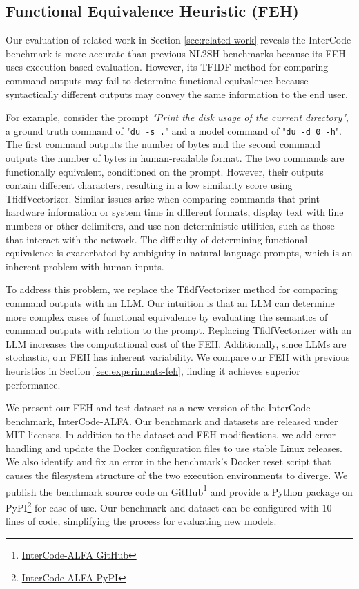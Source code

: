 \documentclass[11pt]{article}
\begin{document}
\subsection{Functional Equivalence Heuristic (FEH)}
Our evaluation of related work in Section \ref{sec:related-work} reveals the InterCode benchmark is more accurate than previous NL2SH benchmarks because its FEH uses execution-based evaluation. However, its TFIDF method for comparing command outputs may fail to determine functional equivalence because syntactically different outputs may convey the same information to the end user.

For example, consider the prompt \textit{"Print the disk usage of the current directory"}, a ground truth command of "\texttt{du -s .}" and a model command of "\texttt{du -d 0 -h}". The first command outputs the number of bytes and the second command outputs the number of bytes in human-readable format. The two commands are functionally equivalent, conditioned on the prompt. However, their outputs contain different characters, resulting in a low similarity score using TfidfVectorizer. Similar issues arise when comparing commands that print hardware information or system time in different formats, display text with line numbers or other delimiters, and use non-deterministic utilities, such as those that interact with the network. The difficulty of determining functional equivalence is exacerbated by ambiguity in natural language prompts, which is an inherent problem with human inputs.

To address this problem, we replace the TfidfVectorizer method for comparing command outputs with an LLM. Our intuition is that an LLM can determine more complex cases of functional equivalence by evaluating the semantics of command outputs with relation to the prompt. Replacing TfidfVectorizer with an LLM increases the computational cost of the FEH. Additionally, since LLMs are stochastic, our FEH has inherent variability. We compare our FEH with previous heuristics in Section \ref{sec:experiments-feh}, finding it achieves superior performance.

We present our FEH and test dataset as a new version of the InterCode benchmark, InterCode-ALFA. Our benchmark and datasets are released under MIT licenses. In addition to the dataset and FEH modifications, we add error handling and update the Docker configuration files to use stable Linux releases. We also identify and fix an error in the benchmark's Docker reset script that causes the filesystem structure of the two execution environments to diverge. We publish the benchmark source code on GitHub\footnote{\href{https://github.com/westenfelder/InterCode-ALFA}{InterCode-ALFA GitHub}} and provide a Python package on PyPI\footnote{\href{https://pypi.org/project/icalfa/}{InterCode-ALFA PyPI}} for ease of use. Our benchmark and dataset can be configured with 10 lines of code, simplifying the process for evaluating new models.
\end{document}
